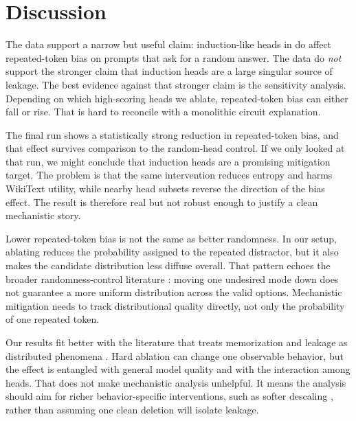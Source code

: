 \section{Discussion}
\label{sec:discussion}

 The data support a narrow but useful claim: induction-like heads in \gptsmall do affect repeated-token bias on prompts that ask for a random answer. The data do \emph{not} support the stronger claim that induction heads are a large singular source of leakage. The best evidence against that stronger claim is the sensitivity analysis. Depending on which high-scoring heads we ablate, repeated-token bias can either fall or rise. That is hard to reconcile with a monolithic circuit explanation.

 The final run shows a statistically strong reduction in repeated-token bias, and that effect survives comparison to the random-head control. If we only looked at that run, we might conclude that induction heads are a promising mitigation target. The problem is that the same intervention reduces entropy and harms WikiText utility, while nearby head subsets reverse the direction of the bias effect. The result is therefore real but not robust enough to justify a clean mechanistic story.

 Lower repeated-token bias is not the same as better randomness. In our setup, ablating \headpair reduces the probability assigned to the repeated distractor, but it also makes the candidate distribution less diffuse overall. That pattern echoes the broader randomness-control literature \cite{zhang2024diffuse}: moving one undesired mode down does not guarantee a more uniform distribution across the valid options. Mechanistic mitigation needs to track distributional quality directly, not only the probability of one repeated token.

 Our results fit better with the literature that treats memorization and leakage as distributed phenomena \cite{lee2022deduplicating, ippolito2022falseprivacy, huang2024memorization}. Hard ablation can change one observable behavior, but the effect is entangled with general model quality and with the interaction among heads. That does not make mechanistic analysis unhelpful. It means the analysis should aim for richer behavior-specific interventions, such as softer descaling \cite{wang2025toxicity}, rather than assuming one clean deletion will isolate leakage.

